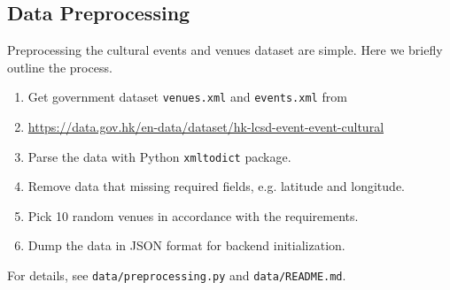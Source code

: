 \subsection{Data Preprocessing}
Preprocessing the cultural events and venues dataset are simple.
Here we briefly outline the process.
\begin{enumerate}
    \item Get government dataset \verb|venues.xml| and \verb|events.xml| from 
    \item[] \url{https://data.gov.hk/en-data/dataset/hk-lcsd-event-event-cultural}
    \item Parse the data with Python \verb|xmltodict| package.
    \item Remove data that missing required fields, e.g. latitude and longitude.
    \item Pick 10 random venues in accordance with the requirements.
    \item Dump the data in JSON format for backend initialization.
\end{enumerate}
For details, see \verb|data/preprocessing.py| and \verb|data/README.md|.